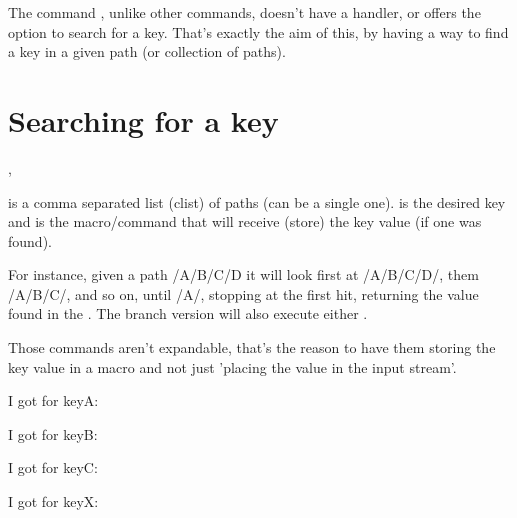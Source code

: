 \documentclass[10pt]{article}
\begin{document}
  
\begin{typesetabstract}

The command \tsobj{\pgfkeysvalueof}, unlike other \tsobj{\pgfkeys} commands, doesn't have a  handler, or offers the option to search for a key.
That's exactly the aim of this, by having a way to find a key in a given path (or collection of paths).
\end{typesetabstract}


\section{Searching for a key}
\begin{codedescribe}{\pgfkeysearchvalueof,\pgfkeysearchvalueofTF}
\begin{codesyntax}%
\end{codesyntax}
 is a comma separated list (clist) of paths (can be a single one).  is the desired key and  is the macro/command that will receive (store) the key value (if one was found).

For instance, given a path /A/B/C/D it will look first at /A/B/C/D/, them /A/B/C/, and so on, until /A/,
stopping at the first hit, returning the value found in the .
The branch version will also execute either .
  
\end{codedescribe}
\begin{tsremark}
  Those commands aren't expandable, that's the reason to have them storing the key value in a macro and not just 'placing the value in the input stream'.
\end{tsremark}

\begin{codestore}
 
 I got for keyA: \textbf{\VALkeyA} \par
 I got for keyB: \textbf{\VALkeyB} \par
 I got for keyC: \textbf{\VALkeyC} \par
 I got for keyX: \textbf{\VALkeyX} \par
 
\end{codestore}
\end{document}
